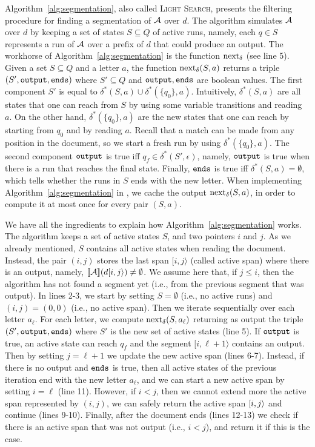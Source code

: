 Algorithm~\ref{alg:segmentation}, also called \textsc{Light Search}, presents
the filtering procedure for finding a segmentation of $\mathcal{A}$ over $d$. The
algorithm simulates $\mathcal{A}$ over $d$ by keeping a set of states $S \subseteq Q$ of
active runs, namely, each $q \in S$ represents a run of $\mathcal{A}$ over a prefix of
$d$ that could produce an output. The workhorse of
Algorithm~\ref{alg:segmentation} is the function $\operatorname{next}_{\delta}$ (see line 5). Given a
set $S \subseteq Q$ and a letter $a$, the function $\operatorname{next}_{\delta}(S, a)$ returns a
triple $(S', \texttt{output}, \texttt{ends})$ where $S' \subseteq Q$ and $\texttt{output}, \texttt{ends}$
are boolean values. The first component $S'$ is equal to $\delta^*(S, a) \cup
\delta^*(\{q_0\}, a)$. Intuitively, $\delta^*(S, a)$ are all states that one can
reach from $S$  by using some variable transitions and reading~$a$. On the other
hand, $\delta^*(\{q_0\}, a)$ are the new states that one can reach by starting
from $q_0$ and by reading $a$. Recall that a match can be made from any position
in the document, so we start a fresh run by using $\delta^*(\{q_0\}, a)$. The
second component $\texttt{output}$ is true iff $q_f \in \delta^*(S', \epsilon)$,
namely, $\texttt{output}$ is true when there is a run that reaches the final state.
Finally, $\texttt{ends}$ is true iff $\delta^*(S, a) = \emptyset$, which tells whether
the runs in $S$ ends with the new letter. When implementing
Algorithm~\ref{alg:segmentation} in \rematch, we cache the output $\operatorname{next}_{\delta}(S,
a)$, in order to compute it at most once for every pair $(S,a)$.

We have all the ingredients to explain how Algorithm~\ref{alg:segmentation}
works. The algorithm keeps a set of active states $S$, and two pointers $i$ and
$j$. As we already mentioned, $S$ contains all active states when reading the
document. Instead, the pair $(i, j)$ stores the last span $[i, j\rangle$ (called
active span) where there is an output, namely, $\llbracket\mathcal{A}\rrbracket(d[i, j\rangle) \neq
\emptyset$. We assume here that, if $j \leq i$, then the algorithm has not found
a segment yet (i.e., from the previous segment that was output). In lines 2-3,
we start by setting $S = \emptyset$ (i.e., no active runs) and $(i,j) = (0,0)$
(i.e., no active span). Then we iterate sequentially over each letter $a_\ell$.
For each letter, we compute $\operatorname{next}_{\delta}(S, a_\ell)$ returning as output the triple
$(S', \texttt{output}, \texttt{ends})$ where $S'$ is the new set of active states (line 5). If
$\texttt{output}$ is true, an active state can reach $q_f$ and the segment $[i,
\ell+1\rangle$ contains an output. Then by setting $j = \ell+1$ we update the
new active span (lines 6-7). Instead, if there is no output and $\texttt{ends}$ is
true, then all active states of the previous iteration end with the new letter
$a_{\ell}$, and we can start a new active span by setting $i = \ell$ (line 11).
However, if $i < j$, then we cannot extend more the active span represented by
$(i,j)$, we can safely return the active span $[i, j\rangle$ and continue (lines
9-10). Finally, after the document ends (lines 12-13) we check if there is an
active span that was not output (i.e., $i < j$), and return it if this is the
case.

